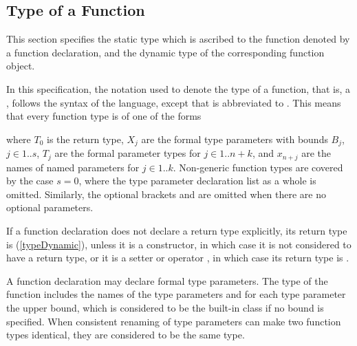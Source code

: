 \documentclass[makeidx]{article}
\begin{document}
\subsection{Type of a Function}

\LMHash{}%
This section specifies the static type which is ascribed to
the function denoted by a function declaration,
and the dynamic type of the corresponding function object.

\LMHash{}%
In this specification,
the notation used to denote the type of a function,
that is, a ,
follows the syntax of the language,
except that \EXTENDS{} is abbreviated to
\FunctionTypeExtends.
This means that every function type is of one of the forms

\noindent
where $T_0$ is the return type,
$X_j$ are the formal type parameters with bounds $B_j$, $j \in 1 .. s$,
$T_j$ are the formal parameter types for $j \in 1 .. n + k$,
and $x_{n+j}$ are the names of named parameters for $j \in 1 .. k$.
Non-generic function types are covered by the case $s = 0$,
where the type parameter declaration list
\code{<\ldots{}>}
as a whole is omitted.
%
Similarly, the optional brackets \code{[]} and \code{\{\}} are omitted
when there are no optional parameters.


\LMHash{}%
If a function declaration does not declare a return type explicitly,
its return type is \DYNAMIC{} (\ref{typeDynamic}),
unless it is a constructor,
in which case it is not considered to have a return type,
or it is a setter or operator \code{[]=},
in which case its return type is \VOID.

\LMHash{}%
A function declaration may declare formal type parameters.
The type of the function includes the names of the type parameters
and for each type parameter the upper bound,
which is considered to be the built-in class 
if no bound is specified.
When consistent renaming of type parameters
can make two function types identical,
they are considered to be the same type.

\end{document}
